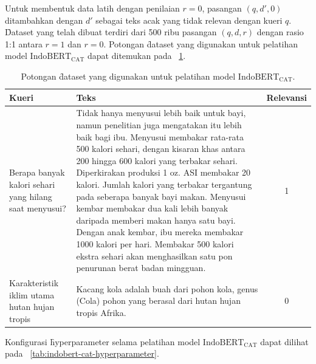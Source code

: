 Untuk membentuk data latih dengan penilaian $r=0$, pasangan $(q, d',0)$ ditambahkan dengan $d'$ sebagai teks acak yang tidak relevan dengan kueri $q$. \f{Dataset} yang telah dibuat terdiri dari 500 ribu pasangan $(q, d, r)$ dengan rasio 1:1 antara $r=1$ dan $r=0$. Potongan \f{dataset} yang digunakan untuk pelatihan model $\text{IndoBERT}_{\text{CAT}}$ dapat ditemukan pada \tab~\ref{tab:contoh-indobert-cat-data}.
\begin{table}
    \centering
    \caption{Potongan \f{dataset} yang digunakan untuk pelatihan model $\text{IndoBERT}_{\text{CAT}}$.}
    \label{tab:contoh-indobert-cat-data}
    \begin{tabular}{|p{3cm}|p{10cm}|c|} \hline
        \textbf{Kueri}                                         & \textbf{Teks}                                                                                                                                                                                                                                                                                                                                                                                                                                                                                                                                                                                          & \textbf{Relevansi} \\ \hline
        Berapa banyak kalori sehari yang hilang saat menyusui? & Tidak hanya menyusui lebih baik untuk bayi, namun penelitian juga mengatakan itu lebih baik bagi ibu. Menyusui membakar rata-rata 500 kalori sehari, dengan kisaran khas antara 200 hingga 600 kalori yang terbakar sehari. Diperkirakan produksi 1 oz. ASI membakar 20 kalori. Jumlah kalori yang terbakar tergantung pada seberapa banyak bayi makan. Menyusui kembar membakar dua kali lebih banyak daripada memberi makan hanya satu bayi. Dengan anak kembar, ibu mereka membakar 1000 kalori per hari. Membakar 500 kalori ekstra sehari akan menghasilkan satu pon penurunan berat badan mingguan. & 1                  \\ \hline
        Karakteristik iklim utama hutan hujan tropis           & Kacang kola adalah buah dari pohon kola, genus (Cola) pohon yang berasal dari hutan hujan tropis Afrika. & 0                  \\ \hline
    \end{tabular}
\end{table}

Konfigurasi \f{hyperparameter} selama pelatihan model $\text{IndoBERT}_{\text{CAT}}$ dapat  dilihat pada \tab~\ref{tab:indobert-cat-hyperparameter}.

